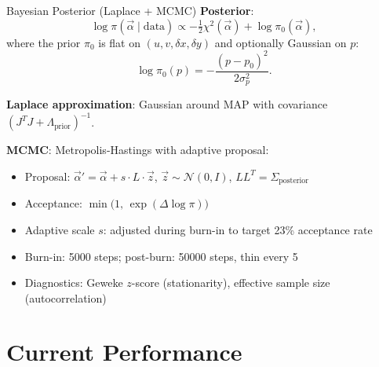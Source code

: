 \documentclass[aspectratio=169]{beamer}
\begin{document}
\begin{frame}{Bayesian Posterior (Laplace + MCMC)}
\small
\textbf{Posterior}:
\[
\log \pi(\vec{\alpha} \mid \mathrm{data}) \propto -\tfrac{1}{2}\chi^2(\vec{\alpha}) + \log \pi_0(\vec{\alpha}),
\]
where the prior $\pi_0$ is flat on $(u, v, \delta x, \delta y)$ and optionally Gaussian on $p$:
\[
\log \pi_0(p) = -\frac{(p - p_0)^2}{2\sigma_p^2}.
\]

\textbf{Laplace approximation}: Gaussian around MAP with covariance $(J^TJ + \Lambda_\mathrm{prior})^{-1}$.

\vspace{0.1cm}
\textbf{MCMC}: Metropolis-Hastings with adaptive proposal:
\begin{itemize}
\item Proposal: $\vec{\alpha}' = \vec{\alpha} + s \cdot L \cdot \vec{z}$, \quad $\vec{z} \sim \mathcal{N}(0, I)$, \quad $LL^T = \Sigma_\mathrm{posterior}$
\item Acceptance: $\min\bigl(1,\, \exp(\Delta \log\pi)\bigr)$
\item Adaptive scale $s$: adjusted during burn-in to target 23\% acceptance rate
\item Burn-in: 5000 steps; post-burn: 50000 steps, thin every 5
\item Diagnostics: Geweke $z$-score (stationarity), effective sample size (autocorrelation)
\end{itemize}
\end{frame}

\section{Current Performance}
\end{document}
